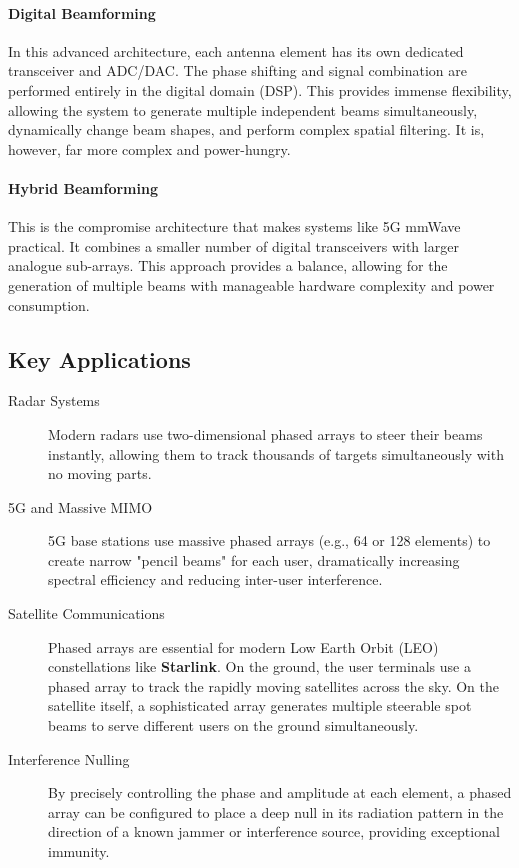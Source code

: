 \paragraph{Digital Beamforming}
In this advanced architecture, each antenna element has its own dedicated transceiver and ADC/DAC. The phase shifting and signal combination are performed entirely in the digital domain (DSP). This provides immense flexibility, allowing the system to generate multiple independent beams simultaneously, dynamically change beam shapes, and perform complex spatial filtering. It is, however, far more complex and power-hungry.

\paragraph{Hybrid Beamforming}
This is the compromise architecture that makes systems like 5G mmWave practical. It combines a smaller number of digital transceivers with larger analogue sub-arrays. This approach provides a balance, allowing for the generation of multiple beams with manageable hardware complexity and power consumption.

\subsection{Key Applications}

\begin{description}
    \item[Radar Systems] Modern  radars use two-dimensional phased arrays to steer their beams instantly, allowing them to track thousands of targets simultaneously with no moving parts.
    \item[5G and Massive MIMO] 5G base stations use massive phased arrays (e.g., 64 or 128 elements) to create narrow "pencil beams" for each user, dramatically increasing spectral efficiency and reducing inter-user interference.
    \item[Satellite Communications] Phased arrays are essential for modern Low Earth Orbit (LEO) constellations like \textbf{Starlink}. On the ground, the user terminals use a phased array to track the rapidly moving satellites across the sky. On the satellite itself, a sophisticated array generates multiple steerable spot beams to serve different users on the ground simultaneously.
    \item[Interference Nulling] By precisely controlling the phase and amplitude at each element, a phased array can be configured to place a deep null in its radiation pattern in the direction of a known jammer or interference source, providing exceptional immunity.
\end{description}

